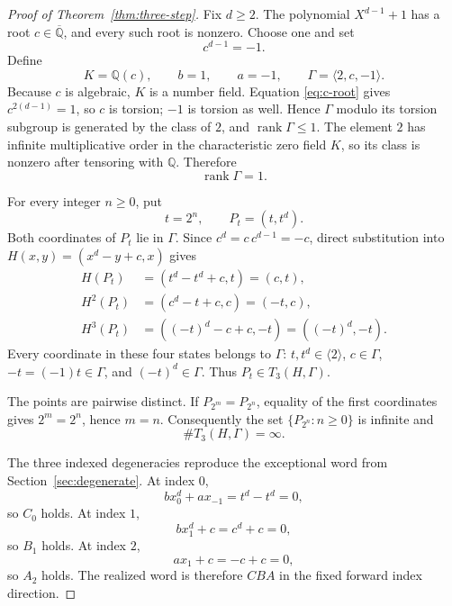 \documentclass[11pt]{article}
\theoremstyle{definition}
\theoremstyle{remark}
\begin{document}
\begin{proof}[Proof of Theorem~\ref{thm:three-step}]
Fix \(d\ge2\).  The polynomial \(X^{d-1}+1\) has a root
\(c\in\overline{\mathbb Q}\), and every such root is nonzero.  Choose one and
set
\begin{equation}\label{eq:c-root}
 c^{d-1}=-1.
\end{equation}
Define
\begin{equation}\label{eq:sharp-data}
 K=\mathbb Q(c),\qquad b=1,\qquad a=-1,\qquad
 \Gamma=\langle2,c,-1\rangle.
\end{equation}
Because \(c\) is algebraic, \(K\) is a number field.  Equation
\eqref{eq:c-root} gives \(c^{2(d-1)}=1\), so \(c\) is torsion; \(-1\) is
torsion as well.  Hence \(\Gamma\) modulo its torsion subgroup is generated
by the class of \(2\), and \(\operatorname{rank}\Gamma\le1\).
The element \(2\) has infinite multiplicative order in the characteristic
zero field \(K\), so its class is nonzero after tensoring with
\(\mathbb Q\).  Therefore
\[
 \operatorname{rank}\Gamma=1.
\]

For every integer \(n\ge0\), put
\[
 t=2^n,\qquad P_t=(t,t^d).
\]
Both coordinates of \(P_t\) lie in \(\Gamma\).  Since
\(c^d=c\,c^{d-1}=-c\), direct substitution into
\(H(x,y)=(x^d-y+c,x)\) gives
\begin{align}
 H(P_t)
  &=(t^d-t^d+c,t)=(c,t),\label{eq:sharp-one}\\
 H^2(P_t)
  &=(c^d-t+c,c)=(-t,c),\label{eq:sharp-two}\\
 H^3(P_t)
  &=((-t)^d-c+c,-t)=((-t)^d,-t).\label{eq:sharp-three}
\end{align}
Every coordinate in these four states belongs to \(\Gamma\):
\(t,t^d\in\langle2\rangle\), \(c\in\Gamma\),
\(-t=(-1)t\in\Gamma\), and \((-t)^d\in\Gamma\).
Thus \(P_t\in T_3(H,\Gamma)\).

The points are pairwise distinct.  If \(P_{2^m}=P_{2^n}\), equality of the
first coordinates gives \(2^m=2^n\), hence \(m=n\).  Consequently the set
\(\{P_{2^n}:n\ge0\}\) is infinite and
\[
 \#T_3(H,\Gamma)=\infty.
\]

The three indexed degeneracies reproduce the exceptional word from
Section~\ref{sec:degenerate}.  At index \(0\),
\[
 b x_0^d+a x_{-1}=t^d-t^d=0,
\]
so \(C_0\) holds.  At index \(1\),
\[
 b x_1^d+c=c^d+c=0,
\]
so \(B_1\) holds.  At index \(2\),
\[
 a x_1+c=-c+c=0,
\]
so \(A_2\) holds.  The realized word is therefore \(CBA\) in the fixed
forward index direction.
\end{proof}
\end{document}
